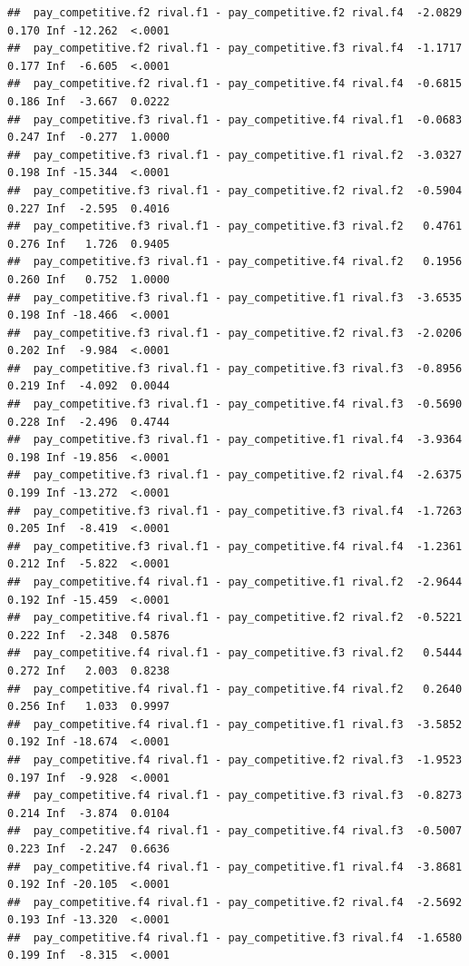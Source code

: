 \documentclass[
]{article}
\begin{document}
\begin{verbatim}
##  pay_competitive.f2 rival.f1 - pay_competitive.f2 rival.f4  -2.0829 0.170 Inf -12.262  <.0001
##  pay_competitive.f2 rival.f1 - pay_competitive.f3 rival.f4  -1.1717 0.177 Inf  -6.605  <.0001
##  pay_competitive.f2 rival.f1 - pay_competitive.f4 rival.f4  -0.6815 0.186 Inf  -3.667  0.0222
##  pay_competitive.f3 rival.f1 - pay_competitive.f4 rival.f1  -0.0683 0.247 Inf  -0.277  1.0000
##  pay_competitive.f3 rival.f1 - pay_competitive.f1 rival.f2  -3.0327 0.198 Inf -15.344  <.0001
##  pay_competitive.f3 rival.f1 - pay_competitive.f2 rival.f2  -0.5904 0.227 Inf  -2.595  0.4016
##  pay_competitive.f3 rival.f1 - pay_competitive.f3 rival.f2   0.4761 0.276 Inf   1.726  0.9405
##  pay_competitive.f3 rival.f1 - pay_competitive.f4 rival.f2   0.1956 0.260 Inf   0.752  1.0000
##  pay_competitive.f3 rival.f1 - pay_competitive.f1 rival.f3  -3.6535 0.198 Inf -18.466  <.0001
##  pay_competitive.f3 rival.f1 - pay_competitive.f2 rival.f3  -2.0206 0.202 Inf  -9.984  <.0001
##  pay_competitive.f3 rival.f1 - pay_competitive.f3 rival.f3  -0.8956 0.219 Inf  -4.092  0.0044
##  pay_competitive.f3 rival.f1 - pay_competitive.f4 rival.f3  -0.5690 0.228 Inf  -2.496  0.4744
##  pay_competitive.f3 rival.f1 - pay_competitive.f1 rival.f4  -3.9364 0.198 Inf -19.856  <.0001
##  pay_competitive.f3 rival.f1 - pay_competitive.f2 rival.f4  -2.6375 0.199 Inf -13.272  <.0001
##  pay_competitive.f3 rival.f1 - pay_competitive.f3 rival.f4  -1.7263 0.205 Inf  -8.419  <.0001
##  pay_competitive.f3 rival.f1 - pay_competitive.f4 rival.f4  -1.2361 0.212 Inf  -5.822  <.0001
##  pay_competitive.f4 rival.f1 - pay_competitive.f1 rival.f2  -2.9644 0.192 Inf -15.459  <.0001
##  pay_competitive.f4 rival.f1 - pay_competitive.f2 rival.f2  -0.5221 0.222 Inf  -2.348  0.5876
##  pay_competitive.f4 rival.f1 - pay_competitive.f3 rival.f2   0.5444 0.272 Inf   2.003  0.8238
##  pay_competitive.f4 rival.f1 - pay_competitive.f4 rival.f2   0.2640 0.256 Inf   1.033  0.9997
##  pay_competitive.f4 rival.f1 - pay_competitive.f1 rival.f3  -3.5852 0.192 Inf -18.674  <.0001
##  pay_competitive.f4 rival.f1 - pay_competitive.f2 rival.f3  -1.9523 0.197 Inf  -9.928  <.0001
##  pay_competitive.f4 rival.f1 - pay_competitive.f3 rival.f3  -0.8273 0.214 Inf  -3.874  0.0104
##  pay_competitive.f4 rival.f1 - pay_competitive.f4 rival.f3  -0.5007 0.223 Inf  -2.247  0.6636
##  pay_competitive.f4 rival.f1 - pay_competitive.f1 rival.f4  -3.8681 0.192 Inf -20.105  <.0001
##  pay_competitive.f4 rival.f1 - pay_competitive.f2 rival.f4  -2.5692 0.193 Inf -13.320  <.0001
##  pay_competitive.f4 rival.f1 - pay_competitive.f3 rival.f4  -1.6580 0.199 Inf  -8.315  <.0001

\end{verbatim}
\end{document}
